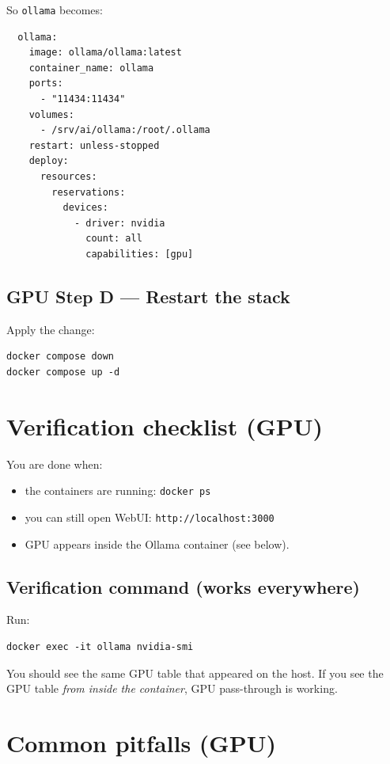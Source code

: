 So \texttt{ollama} becomes:

\begin{lstlisting}
  ollama:
    image: ollama/ollama:latest
    container_name: ollama
    ports:
      - "11434:11434"
    volumes:
      - /srv/ai/ollama:/root/.ollama
    restart: unless-stopped
    deploy:
      resources:
        reservations:
          devices:
            - driver: nvidia
              count: all
              capabilities: [gpu]
\end{lstlisting}


\subsection{GPU Step D --- Restart the stack}
Apply the change:
\begin{lstlisting}
docker compose down
docker compose up -d
\end{lstlisting}

\section{Verification checklist (GPU)}
You are done when:
\begin{itemize}[leftmargin=*]
  \item the containers are running: \texttt{docker ps}
  \item you can still open WebUI: \texttt{http://localhost:3000}
  \item GPU appears inside the Ollama container (see below).
\end{itemize}

\subsection*{Verification command (works everywhere)}
Run:
\begin{lstlisting}
docker exec -it ollama nvidia-smi
\end{lstlisting}
You should see the same GPU table that appeared on the host. If you see the GPU table \emph{from inside the container}, GPU pass-through is working.


\section{Common pitfalls (GPU)}
